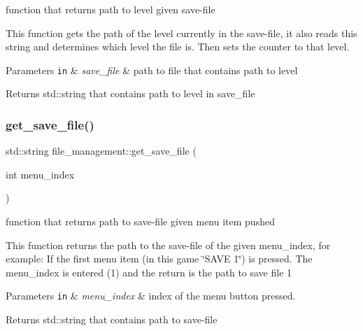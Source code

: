 function that returns path to level given save-\/file 

This function gets the path of the level currently in the save-\/file, it also reads this string and determines which level the file is. Then sets the counter to that level.


\begin{DoxyParams}[1]{Parameters}
\mbox{\tt in}  & {\em save\+\_\+file} & path to file that contains path to level\\
\hline
\end{DoxyParams}
\begin{DoxyReturn}{Returns}
std\+::string that contains path to level in save\+\_\+file 
\end{DoxyReturn}
\mbox{\label{classfile__management_a92ece2d05964c828dcb9bf6c59043327}} 
\subsubsection{\texorpdfstring{get\+\_\+save\+\_\+file()}{get\_save\_file()}}
{\footnotesize\ttfamily std\+::string file\+\_\+management\+::get\+\_\+save\+\_\+file (\begin{DoxyParamCaption}\item[{int}]{menu\+\_\+index }\end{DoxyParamCaption})}



function that returns path to save-\/file given menu item pushed 

This function returns the path to the save-\/file of the given menu\+\_\+index, for example\+: If the first menu item (in this game \char`\"{}\+S\+A\+V\+E 1\char`\"{}) is pressed. The menu\+\_\+index is entered (1) and the return is the path to save file 1


\begin{DoxyParams}[1]{Parameters}
\mbox{\tt in}  & {\em menu\+\_\+index} & index of the menu button pressed.\\
\hline
\end{DoxyParams}
\begin{DoxyReturn}{Returns}
std\+::string that contains path to save-\/file 
\end{DoxyReturn}
\mbox{\label{classfile__management_a97eda13bca5dbe703663bf81f83a77a0}} 

